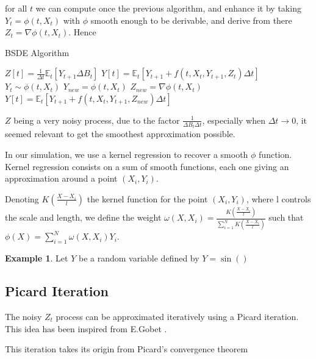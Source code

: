 \documentclass[english,11pt,openany]{article}
\theoremstyle{definition}
\theoremstyle{plain}
\theoremstyle{definition}
\newtheorem{Ex}[Th]{Example}
\begin{document}
	for all $t$ we can compute once the previous algorithm, and enhance it by taking $Y_t = \phi(t, X_t)$ with $\phi$ smooth enough to be derivable, and derive from there $Z_t = \nabla \phi (t, X_t)$. Hence
	
	\begin{algorithm}
		\caption{BSDE Algorithm}
		\label{algo:derivative2}
		\begin{algorithmic}[1]
			\State $Z[t] =\frac{1}{\Delta t}\mathbb{E}_t[Y_{t + 1} \Delta B_t]$ 
			\State $Y[t] = \mathbb{E}_t[Y_{t+1} +  f(t,X_t, Y_{t+1}, Z_t)\Delta t]$
			\State  {} $Y_t \sim \phi(t, X_t)$
			\State  $Y_{new} = \phi(t, X_t)$
			\State 	$Z_{new} = \nabla \phi(t, X_t)$ 
			\State  $Y[t] = \mathbb{E}_t[Y_{t+1} +  f(t,X_t, Y_{t+1}, Z_{new})\Delta t]$
			\EndFor
			\EndFor
			\EndProcedure
		\end{algorithmic}
	\end{algorithm}
	
	$Z$ being a very noisy process, due to the factor $\frac{1}{\Delta B_t\Delta t}$, especially when $\Delta t \rightarrow 0$, it seemed relevant to get the smoothest approximation possible. 
	
	In our simulation, we use a kernel regression to recover a smooth $\phi$ function. 
	Kernel regression consists on a sum of smooth functions, each one giving an approximation around a point $(X_i, Y_i)$. 
	
	Denoting $K(\frac{X - X_i}{l})$ the kernel function for the point $(X_i, Y_i)$, where l controls the scale and length,  we define the weight $\omega(X, X_i) = \frac{K(\frac{X - X_i}{l})}{\sum_{i=1}^{N} K(\frac{X - X_i}{l})}$ such that $\phi(X) = \sum_{i=1}^{N} \omega(X, X_i)Y_i$. 
	
	\begin{Ex}
		Let $Y$ be a random variable defined by $Y = \sin()$
	\end{Ex}
	
	\subsection{Picard Iteration}
	
	The noisy $Z_t$ process can be approximated iteratively using a Picard iteration. This idea has been inspired from E.Gobet \cite{gobet:picard}. 
	
	This iteration takes its origin from Picard's convergence theorem 
	
\end{document}

